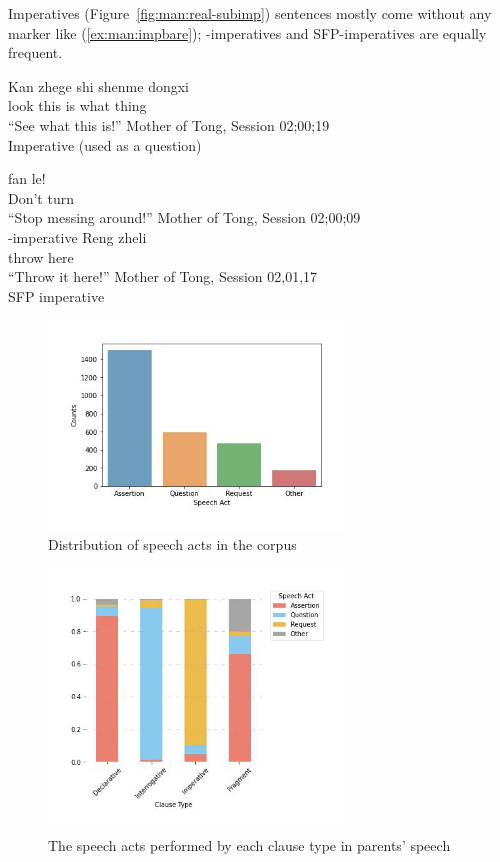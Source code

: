 Imperatives (Figure~\ref{fig:man:real-subimp}) sentences mostly come without any marker like (\ref{ex:man:impbare}); -imperatives and SFP-imperatives are equally frequent. 


\bxl\label{ex:man:impbare}
\gll Kan zhege shi shenme dongxi\\
look this is what thing\\
``See what this is!''  \hfill
Mother of Tong, Session 02;00;19\\
Imperative (used as a question)

\ex \label{ex:man:impbie}
\gll {} fan le!\\
Don't turn \Asp{}\\
``Stop messing around!'' \hfill Mother of Tong, Session 02;00;09\\
-imperative
\ex \label{ex:man:impba}
\gll Reng zheli \\
throw here \Sfp{}\\
\trans ``Throw it here!''
\hfill Mother of Tong, Session 02,01,17\\
SFP imperative
\exl
\eex

\begin{figure}[H]
    \centering
    \includegraphics[width=0.7\textwidth]{figures/man-real-sp.jpg}
    \caption{Distribution of speech acts in the corpus}
    \label{fig:man-real-sp}
\end{figure}

\begin{figure}[H]
    \centering
    \includegraphics[width=0.7\textwidth]{figures/man-real-clsp.jpg}
    \caption{The speech acts performed by each clause type in parents' speech}
    \label{fig:man-real-clsp}
\end{figure}

